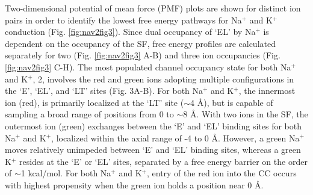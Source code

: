 \begin{refsection}
Two-dimensional potential of mean force (PMF) plots are shown for distinct ion pairs in order to identify the lowest free energy pathways for Na$^+$ and K$^+$ conduction (Fig. \ref{fig:nav2fig3}). Since dual occupancy of `EL' by Na$^+$ is dependent on the occupancy of the SF, free energy profiles are calculated separately for two (Fig. \ref{fig:nav2fig3} A-B) and three ion occupancies (Fig. \ref{fig:nav2fig3} C-H). The most populated channel occupancy state for both Na$^+$ and K$^+$, 2, involves the red and green ions adopting multiple configurations in the `E', `EL', and `LT' sites (Fig. 3A-B). For both Na$^+$ and K$^+$, the innermost ion (red), is primarily localized at the `LT' site ($\sim$4 \AA), but is capable of sampling a broad range of positions from 0 to $\sim$8 \AA. With two ions in the SF, the outermost ion (green) exchanges between the `E' and `EL' binding sites for both Na$^+$ and K$^+$, localized within the axial range of -4 to 0 \AA. However, a green Na$^+$ moves relatively unimpeded between `E' and `EL' binding sites, whereas a green K$^+$ resides at the `E' or `EL' sites, separated by a free energy barrier on the order of $\sim$1 kcal/mol. For both Na$^+$ and K$^+$, entry of the red ion into the CC occurs with highest propensity when the green ion holds a position near 0 \AA. 


\end{refsection}
